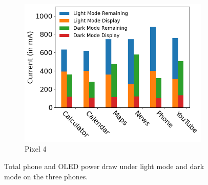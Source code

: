 \begin{figure}[tb]
\begin{subfigure}[]{0.32\textwidth}
		\includegraphics[width=\textwidth]{figure/004_Pixel4_case_study.png}
        \vspace{-0.2in}
		\caption{Pixel 4}
	\end{subfigure}
        \vspace{-0.15in}
	\caption{Total phone and OLED power draw under light mode and dark mode
 on the three phones.}
        \vspace{-0.10in}
	\label{fig:apps_expriment}
\end{figure}

